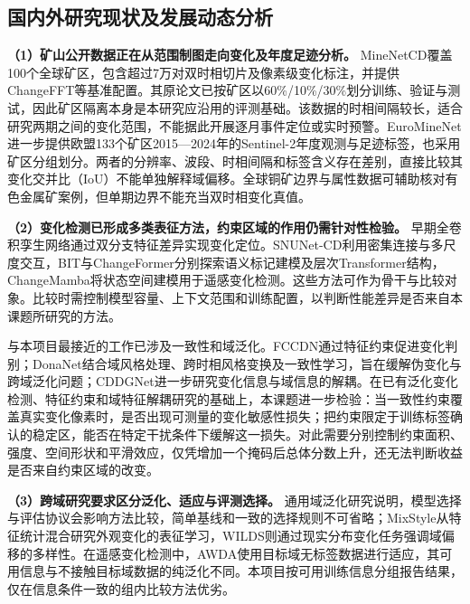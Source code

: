 \subsection{国内外研究现状及发展动态分析}
\textbf{（1）矿山公开数据正在从范围制图走向变化及年度足迹分析。}
MineNetCD覆盖100个全球矿区，包含超过7万对双时相切片及像素级变化标注，并提供ChangeFFT等基准配置。其原论文已按矿区以60\%/10\%/30\%划分训练、验证与测试\cite{Yu2024MineNetCD}，因此矿区隔离本身是本研究应沿用的评测基础。该数据的时相间隔较长，适合研究两期之间的变化范围，不能据此开展逐月事件定位或实时预警。EuroMineNet进一步提供欧盟133个矿区2015—2024年的Sentinel-2年度观测与足迹标签，也采用矿区分组划分\cite{Yu2026EuroMineNet}。两者的分辨率、波段、时相间隔和标签含义存在差别，直接比较其变化交并比（IoU）不能单独解释域偏移。全球铜矿边界与属性数据可辅助核对有色金属矿案例\cite{Li2025Copper}，但单期边界不能充当双时相变化真值。

\textbf{（2）变化检测已形成多类表征方法，约束区域的作用仍需针对性检验。}
早期全卷积孪生网络通过双分支特征差异实现变化定位\cite{Daudt2018Siamese}。SNUNet-CD利用密集连接与多尺度交互\cite{Fang2022SNUNet}，BIT与ChangeFormer分别探索语义标记建模及层次Transformer结构\cite{Chen2022BIT,Bandara2022ChangeFormer}，ChangeMamba将状态空间建模用于遥感变化检测\cite{Chen2024ChangeMamba}。这些方法可作为骨干与比较对象。比较时需控制模型容量、上下文范围和训练配置，以判断性能差异是否来自本课题所研究的方法。

与本项目最接近的工作已涉及一致性和域泛化。FCCDN通过特征约束促进变化判别\cite{Chen2022FCCDN}；DonaNet结合域风格处理、跨时相风格变换及一致性学习，旨在缓解伪变化与跨域泛化问题\cite{Zang2025DonaNet}；CDDGNet进一步研究变化信息与域信息的解耦\cite{Zhao2026CDDG}。在已有泛化变化检测、特征约束和域特征解耦研究的基础上，本课题进一步检验：当一致性约束覆盖真实变化像素时，是否出现可测量的变化敏感性损失；把约束限定于训练标签确认的稳定区，能否在特定干扰条件下缓解这一损失。对此需要分别控制约束面积、强度、空间形状和平滑效应，仅凭增加一个掩码后总体分数上升，还无法判断收益是否来自约束区域的改变。

\textbf{（3）跨域研究要求区分泛化、适应与评测选择。}
通用域泛化研究说明，模型选择与评估协议会影响方法比较，简单基线和一致的选择规则不可省略\cite{Gulrajani2021DomainBed}；MixStyle从特征统计混合研究外观变化的表征学习\cite{Zhou2021MixStyle}，WILDS则通过现实分布变化任务强调域偏移的多样性\cite{Koh2021WILDS}。在遥感变化检测中，AWDA使用目标域无标签数据进行适应\cite{AWDA2025}，其可用信息与不接触目标域数据的纯泛化不同。本项目按可用训练信息分组报告结果，仅在信息条件一致的组内比较方法优劣。

